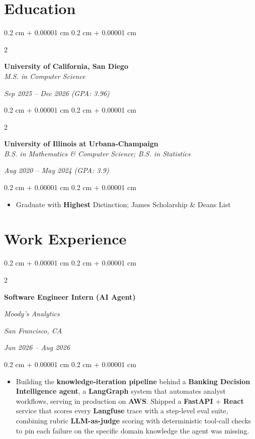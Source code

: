 \documentclass[10pt, letterpaper]{article}
\newenvironment{highlights}{
    \begin{itemize}[
        topsep=0.02 cm,
        parsep=0.02 cm,
        partopsep=0pt,
        itemsep=0pt,
        leftmargin=0.2 cm + 10pt
    ]
}{
    \end{itemize}
} %
\newenvironment{onecolentry}{
    \begin{adjustwidth}{
        0.2 cm + 0.00001 cm
    }{
        0.2 cm + 0.00001 cm
    }
}{
    \end{adjustwidth}
} %
\newenvironment{twocolentry}[2][]{
    \onecolentry
    \def\secondColumn{#2}
    \setcolumnwidth{\fill, 4.5 cm}
    \begin{paracol}{2}
}{
    \switchcolumn \raggedleft \secondColumn
    \end{paracol}
    \endonecolentry
} %
\begin{document}
    \section{Education}

\begin{twocolentry}{
    \textit{Sep 2025 – Dec 2026 (GPA: 3.96)}}
    \textbf{University of California, San Diego} \\[0.2em]
    \textit{M.S. in Computer Science}
\end{twocolentry}

\vspace{0.15 cm}
\begin{twocolentry}{
    \textit{Aug 2020 – May 2024 (GPA: 3.9)}}
    \textbf{University of Illinois at Urbana-Champaign} \\[0.2em]
    \textit{B.S. in Mathematics \& Computer Science; B.S. in Statistics}
\end{twocolentry}

\begin{onecolentry}
    \begin{highlights}
        \item Graduate with \textbf{Highest} Distinction; James Scholarship \& Deans List
    \end{highlights}
\end{onecolentry}


    \section{Work Experience}

        \vspace{0.1 cm}

        \begin{twocolentry}{
            \textit{San Francisco, CA}
        
            \textit{Jun 2026 – Aug 2026}}
            \textbf{Software Engineer Intern (AI Agent)}
        
            \textit{Moody's Analytics}
        \end{twocolentry}
        
        \vspace{0.05 cm}
        \begin{onecolentry}
    \begin{highlights}
        \item Building the \textbf{knowledge-iteration pipeline} behind a \textbf{Banking Decision Intelligence agent}, a \textbf{LangGraph} system that automates analyst workflows, serving in production on \textbf{AWS}. Shipped a \textbf{FastAPI} $+$ \textbf{React} service that scores every \textbf{Langfuse} trace with a step-level eval suite, combining rubric \textbf{LLM-as-judge} scoring with deterministic tool-call checks to pin each failure on the specific domain knowledge the agent was missing.
    \end{highlights}
\end{onecolentry}
        
\end{document}
